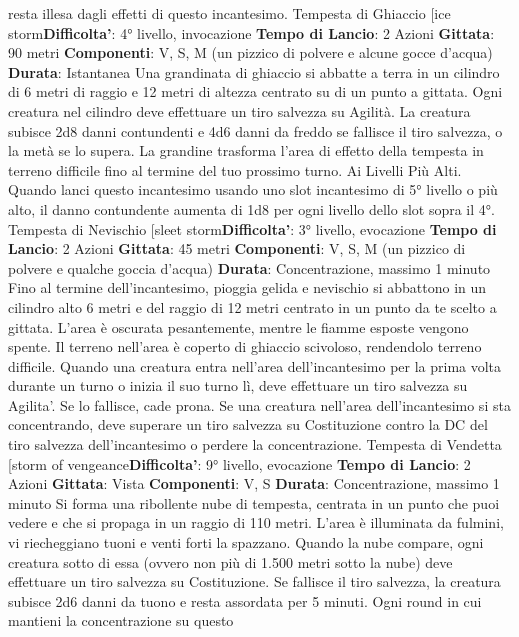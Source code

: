 \begin{multicols}{2}
resta illesa dagli effetti di questo incantesimo.
Tempesta di Ghiaccio
[ice storm\textbf{Difficolta'}:
4° livello, invocazione
\textbf{Tempo di Lancio}: 2 Azioni
\textbf{Gittata}: 90 metri
\textbf{Componenti}: V, S, M (un pizzico di polvere e alcune
gocce d’acqua)
\textbf{Durata}: Istantanea
Una grandinata di ghiaccio si abbatte a terra in un
cilindro di 6 metri di raggio e 12 metri di altezza centrato
su di un punto a gittata. Ogni creatura nel cilindro deve
effettuare un tiro salvezza su Agilità. La creatura
subisce 2d8 danni contundenti e 4d6 danni da freddo
se fallisce il tiro salvezza, o la metà se lo supera.
La grandine trasforma l’area di effetto della tempesta in
terreno difficile fino al termine del tuo prossimo turno.
Ai Livelli Più Alti. Quando lanci questo incantesimo
usando uno slot incantesimo di 5° livello o più alto, il
danno contundente aumenta di 1d8 per ogni livello dello
slot sopra il 4°.
Tempesta di Nevischio
[sleet storm\textbf{Difficolta'}:
3° livello, evocazione
\textbf{Tempo di Lancio}: 2 Azioni
\textbf{Gittata}: 45 metri
\textbf{Componenti}: V, S, M (un pizzico di polvere e qualche
goccia d’acqua)
\textbf{Durata}: Concentrazione, massimo 1 minuto
Fino al termine dell’incantesimo, pioggia gelida e
nevischio si abbattono in un cilindro alto 6 metri e del
raggio di 12 metri centrato in un punto da te scelto a
gittata. L’area è oscurata pesantemente, mentre le
fiamme esposte vengono spente.
Il terreno nell’area è coperto di ghiaccio scivoloso,
rendendolo terreno difficile. Quando una creatura entra
nell’area dell’incantesimo per la prima volta durante un
turno o inizia il suo turno lì, deve effettuare un tiro
salvezza su Agilita'. Se lo fallisce, cade prona.
Se una creatura nell’area dell’incantesimo si sta
concentrando, deve superare un tiro salvezza su
Costituzione contro la DC del tiro salvezza
dell’incantesimo o perdere la concentrazione.
Tempesta di Vendetta
[storm of vengeance\textbf{Difficolta'}:
9° livello, evocazione
\textbf{Tempo di Lancio}: 2 Azioni
\textbf{Gittata}: Vista
\textbf{Componenti}: V, S
\textbf{Durata}: Concentrazione, massimo 1 minuto
Si forma una ribollente nube di tempesta, centrata in un
punto che puoi vedere e che si propaga in un raggio di
110 metri. L’area è illuminata da fulmini, vi riecheggiano
tuoni e venti forti la spazzano. Quando la nube
compare, ogni creatura sotto di essa (ovvero non più di
1.500 metri sotto la nube) deve effettuare un tiro
salvezza su Costituzione. Se fallisce il tiro salvezza, la
creatura subisce 2d6 danni da tuono e resta assordata
per 5 minuti.
Ogni round in cui mantieni la concentrazione su questo

\end{multicols}

